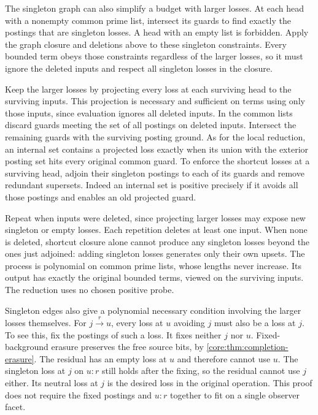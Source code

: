 The singleton graph can also simplify a budget with
larger losses. At each head with a nonempty common
prime list, intersect its guards to find exactly the
postings that are singleton losses. A head with an
empty list is forbidden. Apply the graph closure and
deletions above to these singleton constraints. Every
bounded term obeys those constraints regardless of the
larger losses, so it must ignore the deleted inputs and
respect all singleton losses in the closure.

Keep the larger losses by projecting every loss at
each surviving head to the surviving inputs. This
projection is necessary and sufficient on terms using
only those inputs, since evaluation ignores all deleted
inputs. In the common lists discard guards meeting the
set of all postings on deleted inputs. Intersect the
remaining guards with the surviving posting ground.
As for the local reduction, an internal set contains
a projected loss exactly when its union with the
exterior posting set hits every original common guard.
To enforce the shortcut losses at a surviving head,
adjoin their singleton postings to each of its guards
and remove redundant supersets. Indeed an internal
set is positive precisely if it avoids all those
postings and enables an old projected guard.

Repeat when inputs were deleted, since projecting
larger losses may expose new singleton or empty losses.
Each repetition deletes at least one input. When none
is deleted, shortcut closure alone cannot produce any
singleton losses beyond the ones just adjoined: adding
singleton losses generates only their own upsets.
The process is polynomial on common prime lists,
whose lengths never increase. Its output has exactly
the original bounded terms, viewed on the surviving
inputs. The reduction uses no chosen positive probe.

Singleton edges also give a polynomial necessary
condition involving the larger losses themselves.
For $j\xrightarrow{r}u$, every loss at $u$ avoiding
$j$ must also be a loss at $j$. To see this, fix the
postings of such a loss. It fixes neither $j$ nor $u$.
Fixed-background erasure preserves the free source
bits, by \cref{core:thm:completion-erasure}. The
residual has an empty loss at $u$ and therefore cannot
use $u$. The singleton loss at $j$ on $u{:}r$ still
holds after the fixing, so the residual cannot use
$j$ either. Its neutral loss at $j$ is the desired
loss in the original operation. This proof does not
require the fixed postings and $u{:}r$ together to
fit on a single observer facet.

